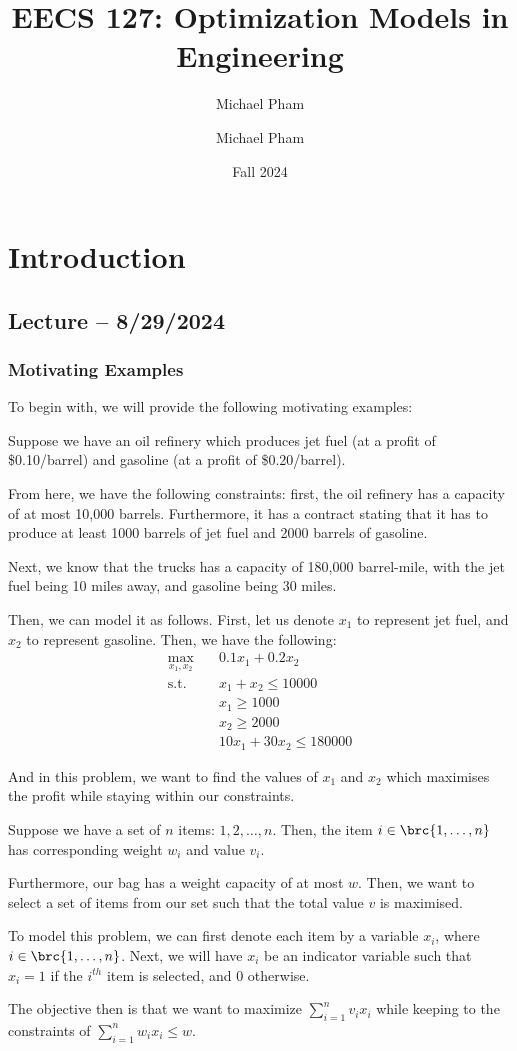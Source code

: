 \documentclass[openany]{book}
\title{#1}
\author{Michael Pham}
\date{#2}
\renewcommand{\mytitle}[2]{%
	\title{#1}
	\author{Michael Pham}
	\date{#2}
	\maketitle
	\newpage
	\mytoc
	\newpage
}
\begin{document}
\mytitle{EECS 127: Optimization Models in Engineering}{Fall 2024}

\chapter{Introduction}
\section{Lecture -- 8/29/2024}
\subsection{Motivating Examples}
To begin with, we will provide the following motivating examples:
\begin{example}
	Suppose we have an oil refinery which produces jet fuel (at a profit of \$0.10/barrel) and gasoline (at a profit of \$0.20/barrel).
	
	From here, we have the following constraints: first, the oil refinery has a capacity of at most 10,000 barrels. Furthermore, it has a contract stating that it has to produce at least 1000 barrels of jet fuel and 2000 barrels of gasoline.
	
	Next, we know that the trucks has a capacity of 180,000 barrel-mile, with the jet fuel being 10 miles away, and gasoline being 30 miles.
	
	Then, we can model it as follows. First, let us denote $x_1$ to represent jet fuel, and $x_2$ to represent gasoline. Then, we have the following:
	\begin{align*}
		\max_{x_1, x_2} &\quad 0.1x_1 + 0.2x_2 \\
		\mathrm{s.t.} &\quad x_1 + x_2 \leq 10000 \\
		&\quad x_1 \geq 1000 \\
		&\quad x_2 \geq 2000 \\
		&\quad 10x_1 + 30x_2 \leq 180000
	\end{align*}

	And in this problem, we want to find the values of $x_1$ and $x_2$ which maximises the profit while staying within our constraints.
\end{example}

\begin{example}
	Suppose we have a set of $n$ items: $1, 2, \ldots, n$. Then, the item $i \in \brc{1, \ldots, n}$ has corresponding weight $w_i$ and value $v_i$.
	
	Furthermore, our bag has a weight capacity of at most $w$. Then, we want to select a set of items from our set such that the total value $v$ is maximised.
	
	To model this problem, we can first denote each item by a variable $x_i$, where $i \in \brc{1, \ldots, n}$. Next, we will have $x_i$ be an indicator variable such that $x_i = 1$ if the $i^{th}$ item is selected, and $0$ otherwise.
	
	The objective then is that we want to maximize $\sum_{i=1}^{n} v_i x_i$ while keeping to the constraints of $\sum_{i=1}^{n} w_i x_i \leq w$.
\end{example}
\end{document}

